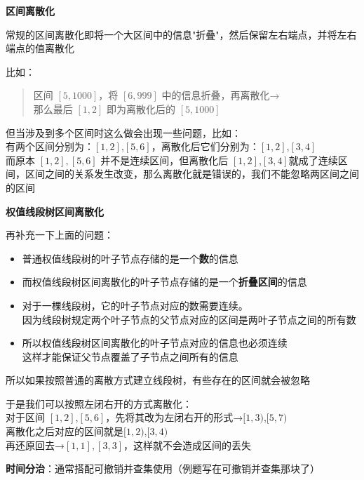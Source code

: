 \documentclass[E:/GsjzTle/main/main.tex]{subfiles}
\begin{document}
\textbf{区间离散化}

常规的区间离散化即将一个大区间中的信息"折叠"，然后保留左右端点，并将左右端点的值离散化

比如：

\begin{quote}
区间 \([5 , 1000]\)，将 \([6,999]\)
中的信息折叠，再离散化\(<5 , 1000>\)→\(<1 , 2>\)\\
那么最后 \([1 , 2]\) 即为离散化后的 \([5,1000]\)
\end{quote}

但当涉及到多个区间时这么做会出现一些问题，比如：\\
有两个区间分别为：\([1,2]\),\([5 , 6]\)，离散化后它们分别为：\([1 , 2]\),\([3,4]\)\\
而原本 \([1 , 2],\)\([5,6]\) 并不是连续区间，但离散化后
\([1,2]\),\([3,4]\)就成了连续区间，区间之间的关系发生改变，那么离散化就是错误的，我们不能忽略两区间之间的区间

\textbf{权值线段树区间离散化}

再补充一下上面的问题：

\begin{itemize}
\item
  普通权值线段树的叶子节点存储的是一个\textbf{数}的信息
\item
  而权值线段树区间离散化的叶子节点存储的是一个\textbf{折叠区间}的信息
\item
  对于一棵线段树，它的叶子节点对应的数需要连续。\\
  因为线段树规定两个叶子节点的父节点对应的区间是两叶子节点之间的所有数
\item
  所以权值线段树区间离散化的叶子节点对应的信息也必须连续\\
  这样才能保证父节点覆盖了子节点之间所有的信息
\end{itemize}

所以如果按照普通的离散方式建立线段树，有些存在的区间就会被忽略

于是我们可以按照左闭右开的方式离散化：\\
对于区间
\([1 , 2]\),\([5,6]\)，先将其改为左闭右开的形式→\([1,3)\),\([5,7)\)\\
离散化之后对应的区间就是\([1 , 2)\),\([3,4)\)\\
再还原回去→\([1,1],[3,3]\)，这样就不会造成区间的丢失

\textbf{时间分治}：通常搭配可撤销并查集使用（例题写在可撤销并查集那块了）
\end{document}
